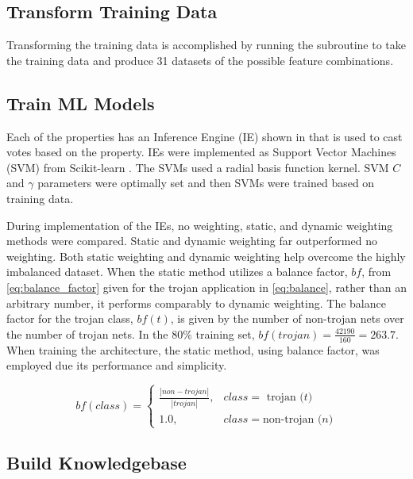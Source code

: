 \subsection{Transform Training Data}

Transforming the training data is accomplished by running the subroutine to take
the training data and produce 31 datasets of the possible feature combinations.

\subsection{Train ML Models}

Each of the properties has an Inference Engine (IE) shown in that is used to
cast votes based on the property. IEs were implemented as Support Vector
Machines (SVM) from Scikit-learn \cite{scikitlearn}. The SVMs used a radial
basis function kernel. SVM $C$ and $\gamma$ parameters were optimally set and
then SVMs were trained based on training data.

During implementation of the IEs, no weighting, static, and dynamic weighting
methods were compared.  Static and dynamic weighting far outperformed no
weighting. Both static weighting and dynamic weighting help overcome the highly
imbalanced dataset.  When the static method utilizes a balance factor, $bf$,
from \ref{eq:balance_factor} given for the trojan application in
\ref{eq:balance}, rather than an arbitrary number, it performs comparably to
dynamic weighting.  The balance factor for the trojan class, $bf(t)$, is given
by the number of non-trojan nets over the number of trojan nets.  In the 80\%
training set, $bf(trojan)=\frac{42190}{160}=263.7$.  When training the
architecture, the static method, using balance factor, was employed due its
performance and simplicity.


\begin{equation}\label{eq:balance}
    bf(class) =
    \begin{cases}
        \frac{|non-trojan|}{|trojan|},& class = \text{ trojan ($t$)} \\
        1.0,& class = \text{non-trojan ($n$)}
    \end{cases}
\end{equation}

\subsection{Build Knowledgebase}

